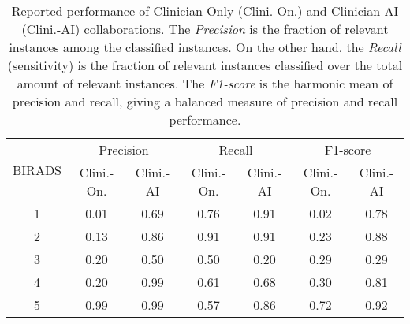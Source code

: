 \begin{table}[htbp]
\centering
\begin{tabular}{|c|c|c|c|c|c|c|}
\hline
\multirow{2}{*}{BIRADS} & \multicolumn{2}{c|}{Precision} & \multicolumn{2}{c|}{Recall} & \multicolumn{2}{c|}{F1-score}   \\ \cline{2-7} 
                        & Clini.-On.      & Clini.-AI    & Clini.-On.     & Clini.-AI    & Clini.-On.     & Clini.-AI    \\ \hline
1                       & 0.01            & 0.69         & 0.76           & 0.91         & 0.02           & 0.78         \\ \hline
2                       & 0.13            & 0.86         & 0.91           & 0.91         & 0.23           & 0.88         \\ \hline
3                       & 0.20            & 0.50         & 0.50           & 0.20         & 0.29           & 0.29         \\ \hline
4                       & 0.20            & 0.99         & 0.61           & 0.68         & 0.30           & 0.81         \\ \hline
5                       & 0.99            & 0.99         & 0.57           & 0.86         & 0.72           & 0.92         \\ \hline
\end{tabular}
\caption{Reported performance of Clinician-Only (Clini.-On.) and Clinician-AI (Clini.-AI) collaborations. The {\it Precision} is the fraction of relevant instances among the classified instances. On the other hand, the {\it Recall} (sensitivity) is the fraction of relevant instances classified over the total amount of relevant instances. The {\it F1-score} is the harmonic mean of precision and recall, giving a balanced measure of precision and recall performance.}
\label{tab:tab005}
\end{table}